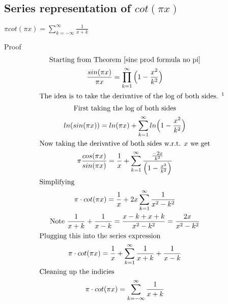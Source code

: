 \documentclass[a4paper]{article}
\begin{document}
\subsection{Series representation of $cot(\pi x)$}
\begin{theorem} 
$\boxed{ \pi cot(\pi x) = \sum_{k=-\infty}^{\infty} \frac{1}{x + k} 
}$

Proof\\
\begin{gather*}
\text{Starting from Theorem \ref{sine prod formula no pi}}
\\
\frac{sin(\pi x)}{\pi x} = \prod_{k=1}^{\infty} \Big( 1-\frac{x^2}{k^2} \Big)
\\
\intertext{The idea is to take the derivative of the log of both sides. \footnotemark}
\text{First taking the log of both sides}
\\
ln(sin(\pi x)) = ln(\pi x) + \sum_{k=1}^{\infty} ln \Big( 1-\frac{x^2}{k^2} \Big)
\\
\text{Now taking the derivative of both sides w.r.t. $x$ we get}
\\
\pi \frac{cos(\pi x)}{sin(\pi x)} = \frac{1}{x} + \sum_{k=1}^{\infty} \frac{\frac{-2x}{k^2}}{\Big( 1-\frac{x^2}{k^2} \Big)} 
\\
\intertext{Simplifying} 
\pi \cdot cot(\pi x) = \frac{1}{x} 
+ 2x \sum_{k=1}^{\infty} \frac{1}{x^2-k^2}
\\
\text{Note   } \frac{1}{x+k} + \frac{1}{x-k} = \frac{x-k + x+k}{x^2-k^2} = \frac{2x}{x^2-k^2}
\\
\intertext{Plugging this into the series expression} 
\pi \cdot cot(\pi x) = \frac{1}{x} 
+ \sum_{k=1}^{\infty} \frac{1}{x+k} + \frac{1}{x-k}
\\
\intertext{Cleaning up the indicies}
\pi \cdot cot(\pi x) = \sum_{k=-\infty}^{\infty} \frac{1}{x+k}
\end{gather*}
\end{theorem}

\end{document}
